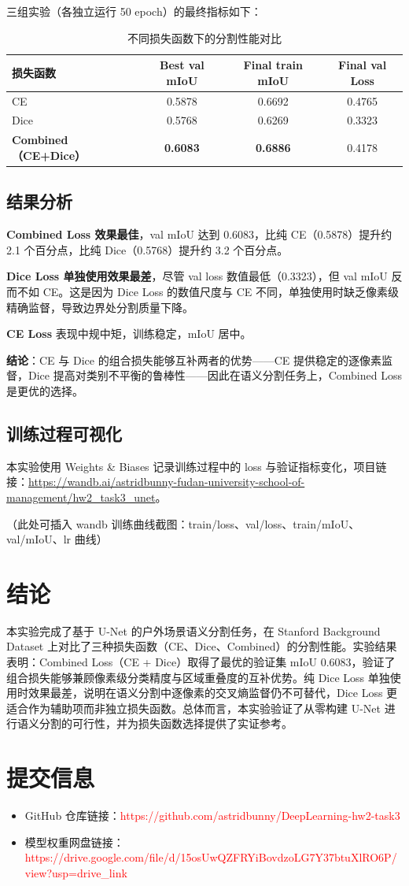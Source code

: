 \documentclass[UTF8,a4paper,12pt,fontset=fandol]{ctexart}
\begin{document}
三组实验（各独立运行 50 epoch）的最终指标如下：

\begin{table}[H]
\centering
\caption{不同损失函数下的分割性能对比}
\begin{tabular}{lccc}
\toprule
损失函数 & Best val mIoU & Final train mIoU & Final val Loss \\
\midrule
CE & 0.5878 & 0.6692 & 0.4765 \\
Dice & 0.5768 & 0.6269 & 0.3323 \\
\textbf{Combined（CE+Dice）} & \textbf{0.6083} & \textbf{0.6886} & 0.4178 \\
\bottomrule
\end{tabular}
\end{table}

\subsection{结果分析}

\textbf{Combined Loss 效果最佳}，val mIoU 达到 0.6083，比纯 CE（0.5878）提升约 2.1 个百分点，比纯 Dice（0.5768）提升约 3.2 个百分点。

\textbf{Dice Loss 单独使用效果最差}，尽管 val loss 数值最低（0.3323），但 val mIoU 反而不如 CE。这是因为 Dice Loss 的数值尺度与 CE 不同，单独使用时缺乏像素级精确监督，导致边界处分割质量下降。

\textbf{CE Loss} 表现中规中矩，训练稳定，mIoU 居中。

\textbf{结论}：CE 与 Dice 的组合损失能够互补两者的优势——CE 提供稳定的逐像素监督，Dice 提高对类别不平衡的鲁棒性——因此在语义分割任务上，Combined Loss 是更优的选择。

\subsection{训练过程可视化}

本实验使用 Weights \& Biases 记录训练过程中的 loss 与验证指标变化，项目链接：\url{https://wandb.ai/astridbunny-fudan-university-school-of-management/hw2_task3_unet}。

（此处可插入 wandb 训练曲线截图：train/loss、val/loss、train/mIoU、val/mIoU、lr 曲线）

\section{结论}
本实验完成了基于 U-Net 的户外场景语义分割任务，在 Stanford Background Dataset 上对比了三种损失函数（CE、Dice、Combined）的分割性能。实验结果表明：Combined Loss（CE + Dice）取得了最优的验证集 mIoU 0.6083，验证了组合损失能够兼顾像素级分类精度与区域重叠度的互补优势。纯 Dice Loss 单独使用时效果最差，说明在语义分割中逐像素的交叉熵监督仍不可替代，Dice Loss 更适合作为辅助项而非独立损失函数。总体而言，本实验验证了从零构建 U-Net 进行语义分割的可行性，并为损失函数选择提供了实证参考。

\section{提交信息}
\begin{itemize}
    \item GitHub 仓库链接：\textcolor{red}{https://github.com/astridbunny/DeepLearning-hw2-task3}
    \item 模型权重网盘链接：\textcolor{red}{https://drive.google.com/file/d/15osUwQZFRYiBovdzoLG7Y37btuXlRO6P/view?usp=drive\_link}
\end{itemize}
\end{document}
